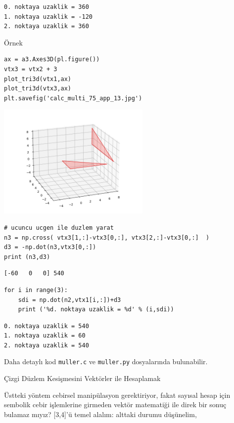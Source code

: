 \documentclass[12pt,fleqn]{article}\usepackage{../../common}
\begin{document}
\begin{verbatim}
0. noktaya uzaklik = 360
1. noktaya uzaklik = -120
2. noktaya uzaklik = 360
\end{verbatim}

Örnek

\begin{verbatim}
ax = a3.Axes3D(pl.figure())
vtx3 = vtx2 + 3
plot_tri3d(vtx1,ax)
plot_tri3d(vtx3,ax)
plt.savefig('calc_multi_75_app_13.jpg')
\end{verbatim}

\includegraphics[width=20em]{calc_multi_75_app_13.jpg}

\begin{verbatim}
# ucuncu ucgen ile duzlem yarat
n3 = np.cross( vtx3[1,:]-vtx3[0,:], vtx3[2,:]-vtx3[0,:]  )
d3 = -np.dot(n3,vtx3[0,:])
print (n3,d3)
\end{verbatim}

\begin{verbatim}
[-60   0   0] 540
\end{verbatim}

\begin{verbatim}
for i in range(3):
    sdi = np.dot(n2,vtx1[i,:])+d3
    print ('%d. noktaya uzaklik = %d' % (i,sdi))
\end{verbatim}

\begin{verbatim}
0. noktaya uzaklik = 540
1. noktaya uzaklik = 60
2. noktaya uzaklik = 540
\end{verbatim}

Daha detaylı kod \verb!muller.c! ve \verb!muller.py! dosyalarında bulunabilir.

Çizgi Düzlem Kesişmesini Vektörler ile Hesaplamak

Üstteki yöntem cebirsel manipülasyon gerektiriyor, fakat sayısal hesap için
sembolik cebir işlemlerine girmeden vektör matematiği ile direk bir sonuç
bulamaz mıyız? [3,4]'ü temel alalım: alttaki durumu düşünelim, 
\end{document}

